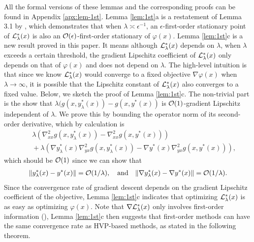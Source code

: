 \documentclass[twoside,11pt]{article}
\begin{document}
All the formal versions of these lemmas and the corresponding proofs can be found in Appendix \ref{apx:lem-1st}.
Lemma \ref{lem:1st}a is a restatement of Lemma 3.1 by \citet{kwon2023fully}, which demonstrates that when $\lambda \asymp \epsilon^{-1}$, an $\epsilon$-first-order stationary point of ${\mathcal{L}}_{\lambda}^*(x)$ is also an ${\mathcal{O}}(\epsilon)$-first-order stationary of $\varphi(x)$.
Lemma \ref{lem:1st}c is a new result proved in this paper. It means although ${\mathcal{L}}_{\lambda}^*(x)$ depends on $\lambda$, when $\lambda$ exceeds a certain threshold, the gradient Lipschitz coefficient of ${\mathcal{L}}_{\lambda}^*(x)$ only depends on that of $\varphi(x)$ and does not depend on $\lambda$.  {
The high-level intuition is that since we know ${\mathcal{L}}_{\lambda}^*(x)$ would converge to a fixed objective $\nabla \varphi(x)$ when $\lambda \rightarrow \infty$, it is possible that the  Lipschitz constant of ${\mathcal{L}}^\ast_\lambda(x)$
also converges to a fixed value. 
Below, we sketch the proof of Lemma \ref{lem:1st}c. The non-trivial part is the show that $ \lambda (g(x,y_{\lambda}^*(x)) - g(x,y^*(x)) $ is ${\mathcal{O}}(1)$-gradient Lipschitz independent of $\lambda$. We prove this by bounding the operator norm of its second-order derivative, which by calculation is
\begin{align*}
    &\quad \lambda (\nabla_{xx}^2 g(x,y_{\lambda}^*(x))-\nabla_{xx}^2 g(x,y^*(x))) \\
    &\quad + \lambda \left(\nabla y_{\lambda}^*(x)  \nabla_{yx}^2 g(x,y_{\lambda}^*(x)) - \nabla y^*(x) \nabla_{yx}^2 g(x,y^*(x)) \right),
\end{align*}
which should be ${\mathcal{O}}(1)$ since we can show that
\begin{align*}
    \Vert y_{\lambda}^*(x) - y^*(x) \Vert = {\mathcal{O}}(1/ \lambda), \quad {\rm and} \quad \Vert \nabla y_{\lambda}^*(x) - \nabla y^*(x) \Vert = {\mathcal{O}}(1/ \lambda).
\end{align*}}
Since the convergence rate of gradient descent depends on the gradient Lipschitz coefficient of the objective, Lemma \ref{lem:1st}c indicates that optimizing ${\mathcal{L}}_{\lambda}^*(x)$ is as easy as optimizing $\varphi(x)$. 
Note that
$\nabla {\mathcal{L}}_{\lambda}^*(x)$ only involves first-order information (), Lemma \ref{lem:1st}c then suggests that first-order methods can have the same convergence rate as HVP-based methods, as stated in the following theorem.

\end{document}
